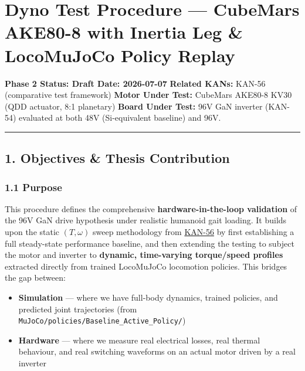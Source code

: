 \documentclass[
]{article}
\author{}
\date{}
\providecommand{\tightlist}{%
  \setlength{\itemsep}{0pt}\setlength{\parskip}{0pt}}
\begin{document}
\section{Dyno Test Procedure --- CubeMars AKE80-8 with Inertia Leg \&
LocoMuJoCo Policy
Replay}\label{dyno-test-procedure-cubemars-ake80-8-with-inertia-leg-locomujoco-policy-replay}

\textbf{Phase 2 \textbar{} Status: Draft \textbar{} Date: 2026-07-07}
\textbf{Related KANs:} KAN-56 (comparative test framework) \textbf{Motor
Under Test:} CubeMars AKE80-8 KV30 (QDD actuator, 8:1 planetary)
\textbf{Board Under Test:} 96V GaN inverter (KAN-54) evaluated at both
48V (Si-equivalent baseline) and 96V.

\begin{center}\rule{0.5\linewidth}{0.5pt}\end{center}

\subsection{1. Objectives \& Thesis
Contribution}\label{objectives-thesis-contribution}

\subsubsection{1.1 Purpose}\label{purpose}

This procedure defines the comprehensive \textbf{hardware-in-the-loop
validation} of the 96V GaN drive hypothesis under realistic humanoid
gait loading. It builds upon the static \((T, \omega)\) sweep
methodology from \href{../../../docs/KAN-56_test_plan.md}{KAN-56} by
first establishing a full steady-state performance baseline, and then
extending the testing to subject the motor and inverter to
\textbf{dynamic, time-varying torque/speed profiles} extracted directly
from trained LocoMuJoCo locomotion policies. This bridges the gap
between:

\begin{itemize}
\tightlist
\item
  \textbf{Simulation} --- where we have full-body dynamics, trained
  policies, and predicted joint trajectories (from
  \texttt{MuJoCo/policies/Baseline\_Active\_Policy/})
\item
  \textbf{Hardware} --- where we measure real electrical losses, real
  thermal behaviour, and real switching waveforms on an actual motor
  driven by a real inverter
\end{itemize}
\end{document}
